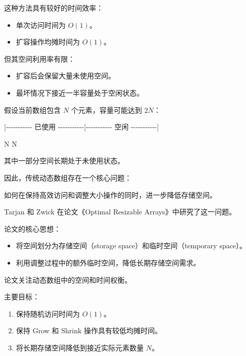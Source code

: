 \documentclass[
  UTF8,
  a4paper,
  12pt]{ctexart}
\newenvironment{Shaded}{}{}
\newcommand{\NormalTok}[1]{#1}
\providecommand{\tightlist}{%
  \setlength{\itemsep}{0pt}\setlength{\parskip}{0pt}}
\begin{document}
这种方法具有较好的时间效率：

\begin{itemize}
\tightlist
\item
  单次访问时间为 \(O(1)\)。
\item
  扩容操作均摊时间为 \(O(1)\)。
\end{itemize}

但其空间利用率有限：

\begin{itemize}
\tightlist
\item
  扩容后会保留大量未使用空间。
\item
  最坏情况下接近一半容量处于空闲状态。
\end{itemize}

假设当前数组包含 \(N\) 个元素，容量可能达到 \(2N\)：

\begin{Shaded}
\begin{Highlighting}[]
\NormalTok{|{-}{-}{-}{-}{-}{-}{-}{-}{-}{-}{-} 已使用 {-}{-}{-}{-}{-}{-}{-}{-}{-}{-}{-}|{-}{-}{-}{-}{-}{-}{-}{-}{-}{-}{-} 空闲 {-}{-}{-}{-}{-}{-}{-}{-}{-}{-}{-}|}

\NormalTok{             N                     N}
\end{Highlighting}
\end{Shaded}

其中一部分空间长期处于未使用状态。

因此，传统动态数组存在一个核心问题：

如何在保持高效访问和调整大小操作的同时，进一步降低存储空间。

Tarjan 和 Zwick 在论文《Optimal Resizable Arrays》中研究了这一问题。

论文的核心思想：

\begin{itemize}
\tightlist
\item
  将空间划分为存储空间（storage space）和临时空间（temporary space）。
\item
  利用调整过程中的额外临时空间，降低长期存储空间需求。
\end{itemize}

论文关注动态数组中的空间和时间权衡。

主要目标：

\begin{enumerate}
\def\labelenumi{\arabic{enumi}.}
\tightlist
\item
  保持随机访问时间为 \(O(1)\)。
\item
  保持 Grow 和 Shrink 操作具有较低均摊时间。
\item
  将长期存储空间降低到接近实际元素数量 \(N\)。
\end{enumerate}
\end{document}
